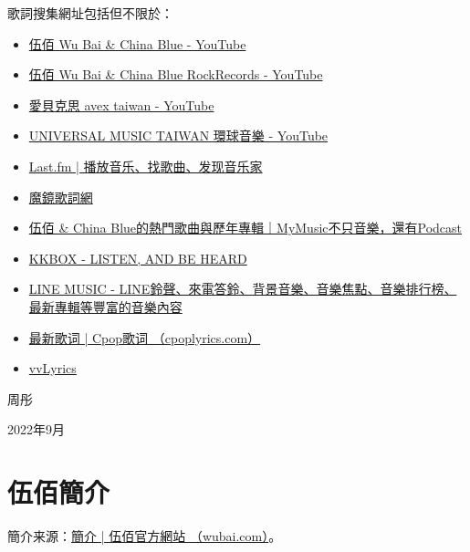 \documentclass[UTF8,a4paper,oneside,twocolumn,12pt]{ctexbook}
\begin{document}
歌詞搜集網址包括但不限於：
\begin{itemize}
	\item \href{https://www.youtube.com/channel/UCHocIer4qdnCmgvHlNrpqFA}{伍佰 Wu Bai \& China Blue - YouTube}
	\item \href{https://www.youtube.com/channel/UCCTYHJZvsRCLvm5Afi9XJXA}{伍佰 Wu Bai \& China Blue RockRecords - YouTube}
	\item \href{https://www.youtube.com/c/愛貝克思avextaiwan}{愛貝克思 avex taiwan - YouTube}
	\item \href{https://www.youtube.com/c/universaltwn/search?query=伍佰}{UNIVERSAL MUSIC TAIWAN 環球音樂 - YouTube}
	\item \href{https://www.last.fm/zh/}{Last.fm | 播放音乐、找歌曲、发现音乐家}
	\item \href{https://mojim.com/twznew.htm}{魔鏡歌詞網}
	\item \href{https://www.mymusic.net.tw/ux/w/singer/show/245}{伍佰 \& China Blue的熱門歌曲與歷年專輯｜MyMusic不只音樂，還有Podcast}
	\item \href{https://www.kkbox.com/tw/tc/}{KKBOX - LISTEN, AND BE HEARD}
	\item \href{https://music-tw.line.me/}{LINE MUSIC - LINE鈴聲、來電答鈴、背景音樂、音樂焦點、音樂排行榜、最新專輯等豐富的音樂內容}
	\item \href{https://www.cpoplyrics.com/}{最新歌词 | Cpop歌词 （cpoplyrics.com）}
	\item \href{https://vvlyrics.com/}{vvLyrics}
\end{itemize}

\begin{flushright}
	周彤

	2022年9月
\end{flushright}

\chapter*{伍佰簡介}
簡介来源：\href{http://wubai.com/biography/%e7%b0%a1%e4%bb%8b/}{簡介 | 伍佰官方網站 （wubai.com）}。
\end{document}
